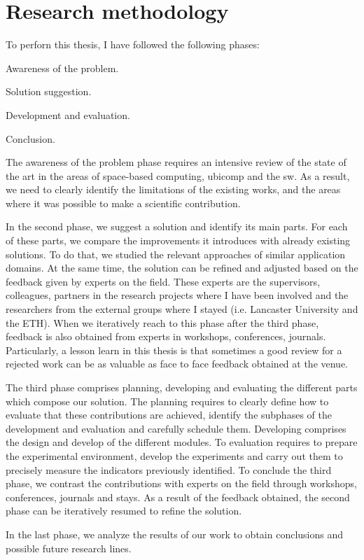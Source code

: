 \section{Research methodology}

To perforn this thesis, I have followed the following phases:
\begin{enumerate*}[label=\itshape\alph*\upshape)]
  \item Awareness of the problem.
  \item Solution suggestion.
  \item Development and evaluation.
  \item Conclusion.
\end{enumerate*}


The awareness of the problem phase requires an intensive review of the state of the art in the areas of
space-based computing, \acl{ubicomp} and the \acl{sw}.
As a result, we need to clearly identify the limitations of the existing works,
and the areas where it was possible to make a scientific contribution.


In the second phase, we suggest a solution and identify its main parts.
For each of these parts, we compare the improvements it introduces with already existing solutions.
To do that, we studied the relevant approaches of similar application domains.
At the same time, the solution can be refined and adjusted based on the feedback given by experts on the field.
These experts are the supervisors, colleagues, partners in the research projects where I have been involved and the researchers from the external groups where I stayed (i.e. Lancaster University and the ETH).
When we iteratively reach to this phase after the third phase, feedback is also obtained from experts in workshops, conferences, journals.
Particularly, a lesson learn in this thesis is that sometimes a good review for a rejected work can be as valuable as face to face feedback obtained at the venue. %


The third phase comprises planning, developing and evaluating the different parts which compose our solution.
The planning requires to clearly define how to evaluate that these contributions are achieved, identify the subphases of the development and evaluation and carefully schedule them.
Developing comprises the design and develop of the different modules.
To evaluation requires to prepare the experimental environment, develop the experiments and carry out them to precisely measure the indicators previously identified. %
To conclude the third phase, we contrast the contributions with experts on the field through workshops, conferences, journals and stays.
As a result of the feedback obtained, the second phase can be iteratively resumed to refine the solution.


In the last phase, we analyze the results of our work to obtain conclusions and possible future research lines.
